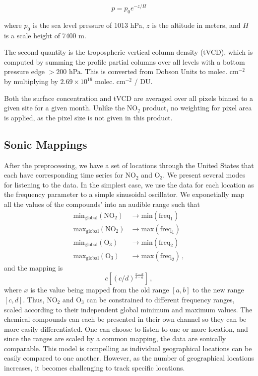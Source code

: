 \documentclass[a4paper,10pt,oneside]{article}
\newcommand{\ce}[1]{$\mathrm{#1}$}
\begin{document}
\begin{sloppy}
	\begin{equation}
	\label{eqn:pres-scale-height}
	p = p_0 e^{-z/H}
	\end{equation}
	
	where $p_0$ is the sea level pressure of 1013 hPa, $z$ is the altitude in meters, and $H$ is a scale height of 7400 m.
	
	The second quantity is the tropospheric vertical column density (tVCD), which is computed by summing the profile partial columns over all levels with a bottom pressure edge $> 200$ hPa. This is converted from Dobson Units to molec. cm$^{-2}$ by multiplying by $2.69 \times 10^{16}$
molec. cm$^{-2}$ / DU. 

	Both the surface concentration and tVCD are averaged over all pixels binned to a given site for a given month. Unlike the \ce{NO_2} product, no weighting for pixel area is applied, as the pixel size is not given in this product.
	 
\subsection{Sonic Mappings}
After the preprocessing, we have a set of locations through the United States that each have corresponding time series for \ce{NO_2} and \ce{O_3}. We present several modes for listening to the data. In the simplest case, we use the data for each location as the frequency parameter to a simple sinusoidal oscillator.  We exponetially map all the values of the compounds' into an audible range such that 
\begin{align}
    \text{min}_{\text{global}}(\text{\ce{NO_2}}) &\rightarrow
    \text{min}(\text{freq}_1) \\
    \text{max}_{\text{global}}(\text{\ce{NO_2}}) &\rightarrow
    \text{max}(\text{freq}_1) \\
    \text{min}_{\text{global}}(\text{\ce{O_3}}) &\rightarrow
    \text{min}(\text{freq}_2) \\
    \text{max}_{\text{global}}(\text{\ce{O_3}}) &\rightarrow
    \text{max}(\text{freq}_2)
    \,,
\end{align}
and the mapping is
\begin{equation}
    c \left[(c/d)^{\frac{x-a}{b-a}}\right]\,,
\end{equation}
where $x$ is the value being mapped from the old range $[a, b]$ to the new range $[c, d]$.  Thus, \ce{NO_2} and \ce{O_3} can be constrained to different frequency ranges, scaled according to their independent global minimum and maximum values.  The chemical compounds can each be presented in their own channel so they can be more easily differentiated.  One can choose to listen to one or more location, and since the ranges are scaled by a common mapping, the data are sonically comparable. This model is compelling as individual geographical locations can be easily compared to one another. However, as the number of geographical locations increases, it becomes challenging to track specific locations. 


\end{sloppy}
\end{document}
